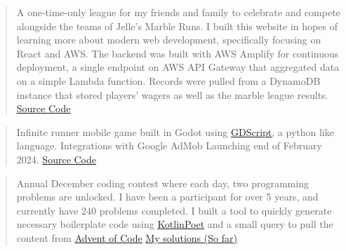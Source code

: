 

\begin{cvparagraph}

\begin{quote}
\thinspace A one-time-only league for my friends and family to celebrate and compete alongside the teams of Jelle's Marble Runs. I built this website in hopes of learning 
more about modern web development, specifically focusing on React and AWS. The backend was built with AWS Amplify for continuous deployment, a single endpoint on AWS API Gateway
that aggregated data on a simple Lambda function. Records were pulled from a DynamoDB instance that stored players' wagers as well as the marble league results.
\newline\href{https://github.com/johnsoe/thg_marbles}{\underline {Source Code}}
\end{quote}

\begin{quote}
\thinspace Infinite runner mobile game built in Godot using \href{https://docs.godotengine.org/en/stable/tutorials/scripting/gdscript/gdscript_basics.html}{\underline{GDScript}}, a python like language. Integrations with Google AdMob Launching end of February 2024.
\newline\href{https://github.com/johnsoe/Track-Four}{\underline {Source Code}}
\end{quote}

\begin{quote}
\thinspace Annual December coding contest where each day, two programming problems are unlocked. I have been a participant for over 5 years, and currently have 240 problems completed.
I built a tool to quickly generate necessary boilerplate code using \href{https://square.github.io/kotlinpoet/}{\underline{KotlinPoet}} and a small query to pull the content from \href{https://adventofcode.com}{\underline{Advent of Code}}
\newline\href{https://github.com/johnsoe/advent_kotlin}{\underline {My solutions (So far)}}
\end{quote}


\end{cvparagraph}
